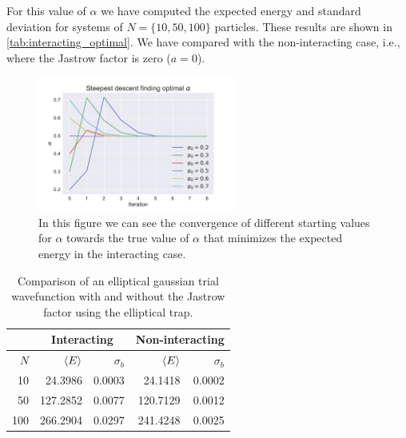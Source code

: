 \documentclass[
    a4paper, aps, twocolumn, floatfix, superscriptaddress,
    nofootinbib]{revtex4-1}
\newcommand{\1}{\mathds{1}}
\begin{document}
            For this value of $\alpha$ we have computed the expected energy and
            standard deviation for systems of $N = \{10, 50, 100\}$ particles.
            These results are shown in \autoref{tab:interacting_optimal}. We have
            compared with the non-interacting case, i.e., where the Jastrow
            factor is zero ($a = 0$).

            \begin{figure}
                \includegraphics[width=244px]{../data/figures/problem_f.pdf}
                \caption{In this figure we can see the convergence of different
                starting values for $\alpha$ towards the true value of $\alpha$
                that minimizes the expected energy in the interacting case.}
                \label{fig:gradient_descent_interacting}
            \end{figure}

            \begin{table}
                \caption{Comparison of an elliptical gaussian trial wavefunction
                with and without the Jastrow factor using the elliptical trap.}
                \centering
                \begin{ruledtabular}
                    \begin{tabular}{r|rr|rr}
                        & \multicolumn{2}{c|}{Interacting}
                        & \multicolumn{2}{c}{Non-interacting} \\
                        \hline
                        $N$ & $\expval{E}$ & $\sigma_b$ & $\expval{E}$
                        & $\sigma_b$ \\
                        \hline
                        10 & 24.3986 & 0.0003 & 24.1418 & 0.0002 \\
                        50 & 127.2852 & 0.0077 & 120.7129 & 0.0012 \\
                        100 & 266.2904 & 0.0297 & 241.4248 & 0.0025
                    \end{tabular}
                \end{ruledtabular}
                \label{tab:interacting_optimal}
            \end{table}
\end{document}
